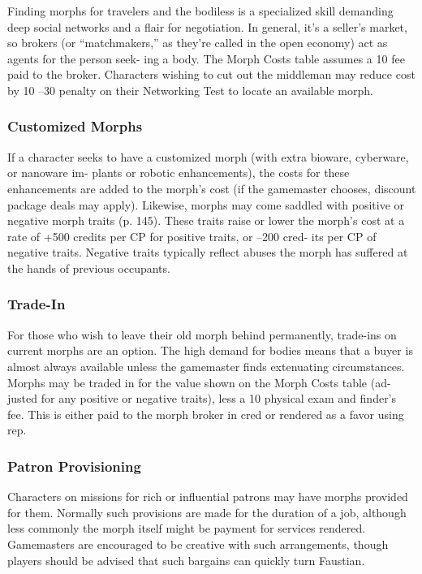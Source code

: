 Finding morphs for travelers and the bodiless is a 
specialized skill demanding deep social networks and 
a flair for negotiation. In general, it's a seller's market, 
so brokers (or ``matchmakers,'' as they're called in 
the open economy) act as agents for the person seek-
ing a body. The Morph Costs table assumes a 10%
fee paid to the broker. Characters wishing to cut out 
the middleman may reduce cost by 10%
–30 penalty on their Networking Test to locate an 
available morph.

\subsubsection{Customized Morphs}

If a character seeks to have a customized morph 
(with extra bioware, cyberware, or nanoware im-
plants or robotic enhancements), the costs for these 
enhancements are added to the morph's cost (if the 
gamemaster chooses, discount package deals may 
apply). Likewise, morphs may come saddled with 
positive or negative morph traits (p. 145). These 
traits raise or lower the morph's cost at a rate of 
+500 credits per CP for positive traits, or –200 cred-
its per CP of negative traits. Negative traits typically 
reflect abuses the morph has suffered at the hands of 
previous occupants.

\subsubsection{Trade-In}

For those who wish to leave their old morph behind 
permanently, trade-ins on current morphs are an 
option. The high demand for bodies means that a buyer 
is almost always available unless the gamemaster finds 
extenuating circumstances. Morphs may be traded in 
for the value shown on the Morph Costs table (ad-
justed for any positive or negative traits), less a 10%
physical exam and finder's fee. This is either paid to the 
morph broker in cred or rendered as a favor using rep.

\subsubsection{Patron Provisioning}

Characters on missions for rich or influential patrons 
may have morphs provided for them. Normally 
such provisions are made for the duration of a job, 
although less commonly the morph itself might be 
payment for services rendered. Gamemasters are 
encouraged to be creative with such arrangements, 
though players should be advised that such bargains 
can quickly turn Faustian.

